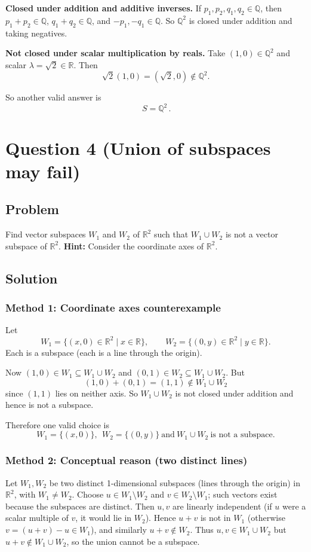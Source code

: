 \documentclass[12pt]{article}
\begin{document}
\textbf{Closed under addition and additive inverses.}
If \(p_1,p_2,q_1,q_2\in\mathbb{Q}\), then \(p_1+p_2\in\mathbb{Q}\), \(q_1+q_2\in\mathbb{Q}\), and \(-p_1,-q_1\in\mathbb{Q}\).
So \(\mathbb{Q}^2\) is closed under addition and taking negatives.

\textbf{Not closed under scalar multiplication by reals.}
Take \((1,0)\in\mathbb{Q}^2\) and scalar \(\lambda=\sqrt{2}\in\mathbb{R}\). Then
\[
\sqrt{2}(1,0)=(\sqrt{2},0)\notin\mathbb{Q}^2.
\]

So another valid answer is
\[
\boxed{\,S=\mathbb{Q}^2\, }.
\]

\newpage
\section{Question 4 (Union of subspaces may fail)}
\subsection{Problem}
Find vector subspaces \(W_1\) and \(W_2\) of \(\mathbb{R}^2\) such that \(W_1\cup W_2\) is not a vector subspace of \(\mathbb{R}^2\).
\newline
\textbf{Hint:} Consider the coordinate axes of \(\mathbb{R}^2\).

\subsection{Solution}

\subsubsection{Method 1: Coordinate axes counterexample}
Let
\[
W_1=\{(x,0)\in\mathbb{R}^2\mid x\in\mathbb{R}\},\qquad
W_2=\{(0,y)\in\mathbb{R}^2\mid y\in\mathbb{R}\}.
\]
Each is a subspace (each is a line through the origin).

Now \((1,0)\in W_1\subseteq W_1\cup W_2\) and \((0,1)\in W_2\subseteq W_1\cup W_2\).
But
\[
(1,0)+(0,1)=(1,1)\notin W_1\cup W_2
\]
since \((1,1)\) lies on neither axis.
So \(W_1\cup W_2\) is not closed under addition and hence is not a subspace.

Therefore one valid choice is
\[
\boxed{\,W_1=\{(x,0)\},\ \ W_2=\{(0,y)\}\ \text{and}\ W_1\cup W_2\ \text{is not a subspace.}\,}
\]

\subsubsection{Method 2: Conceptual reason (two distinct lines)}
Let \(W_1,W_2\) be two distinct 1-dimensional subspaces (lines through the origin) in \(\mathbb{R}^2\), with \(W_1\neq W_2\).
Choose \(u\in W_1\setminus W_2\) and \(v\in W_2\setminus W_1\); such vectors exist because the subspaces are distinct.
Then \(u,v\) are linearly independent (if \(u\) were a scalar multiple of \(v\), it would lie in \(W_2\)).
Hence \(u+v\) is not in \(W_1\) (otherwise \(v=(u+v)-u\in W_1\)), and similarly \(u+v\notin W_2\).
Thus \(u,v\in W_1\cup W_2\) but \(u+v\notin W_1\cup W_2\), so the union cannot be a subspace.
\end{document}

